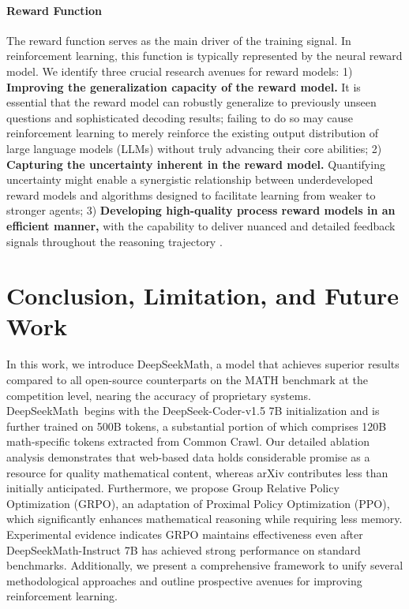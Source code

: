 \begin{itemize}[topsep=0pt]
\paragraph{Reward Function} The reward function serves as the main driver of the training signal. In reinforcement learning, this function is typically represented by the neural reward model. We identify three crucial research avenues for reward models: 1) \textbf{Improving the generalization capacity of the reward model.} It is essential that the reward model can robustly generalize to previously unseen questions and sophisticated decoding results; failing to do so may cause reinforcement learning to merely reinforce the existing output distribution of large language models (LLMs) without truly advancing their core abilities; 2) \textbf{Capturing the uncertainty inherent in the reward model.} Quantifying uncertainty might enable a synergistic relationship between underdeveloped reward models and algorithms designed to facilitate learning from weaker to stronger agents; 3) \textbf{Developing high-quality process reward models in an efficient manner,} with the capability to deliver nuanced and detailed feedback signals throughout the reasoning trajectory \citep{lightman2023let,wang2023math}.

\section{Conclusion, Limitation, and Future Work} In this work, we introduce DeepSeekMath, a model that achieves superior results compared to all open-source counterparts on the MATH benchmark at the competition level, nearing the accuracy of proprietary systems. DeepSeekMath~begins with the DeepSeek-Coder-v1.5 7B initialization and is further trained on 500B tokens, a substantial portion of which comprises 120B math-specific tokens extracted from Common Crawl. Our detailed ablation analysis demonstrates that web-based data holds considerable promise as a resource for quality mathematical content, whereas arXiv contributes less than initially anticipated. Furthermore, we propose Group Relative Policy Optimization (GRPO), an adaptation of Proximal Policy Optimization (PPO), which significantly enhances mathematical reasoning while requiring less memory. Experimental evidence indicates GRPO maintains effectiveness even after DeepSeekMath-Instruct 7B has achieved strong performance on standard benchmarks. Additionally, we present a comprehensive framework to unify several methodological approaches and outline prospective avenues for improving reinforcement learning.


\end{itemize}
